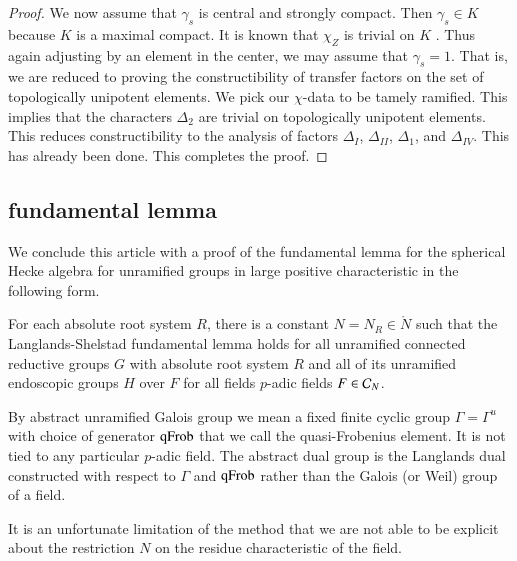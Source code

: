\begin{proof}
We now assume that $\gamma_s$ is central and strongly compact.  Then $\gamma_s\in K$ because $K$ is a maximal compact.
It is known that $\chi_Z$ is trivial on $K$ \cite[Lemma 3.2]{hales1995fundamental}. Thus again adjusting by an element in the center,
we may assume that $\gamma_s=1$.  That is, we are reduced to proving the constructibility of transfer factors on the set of topologically
unipotent elements.  We pick our $\chi$-data to be tamely ramified.  This implies that the characters $\Delta_2$ are trivial
on topologically unipotent elements.  This reduces constructibility to the analysis of factors $\Delta_I$, $\Delta_{II}$, $\Delta_1$, and $\Delta_{IV}$.
This has already been done.  This completes the proof.
\end{proof}


\subsection{fundamental lemma}

We conclude this article with a proof of the fundamental lemma for the spherical Hecke algebra for unramified groups in large positive characteristic
in the following form.

\begin{theorem}  \label{thm:fl}
For each absolute root system $R$,
there is a constant $N=N_R\in\ring{N}$ such that
the Langlands-Shelstad fundamental lemma holds for all unramified connected reductive groups $G$ with absolute root system $R$ 
and all of its unramified endoscopic groups $H$ over $F$ 
for all fields $p$-adic fields $F\in \mathcal C_N$.
\end{theorem}

By abstract unramified Galois group we mean a fixed finite cyclic group $\Gamma=\Gamma^u$ with choice of generator ${\operatorname{qFrob}}$
that we call the quasi-Frobenius element.  It is not tied to any particular $p$-adic field.   The abstract dual group is the Langlands
dual constructed with respect to $\Gamma$ and ${\operatorname{qFrob}}$ rather than the Galois (or Weil) group of a field.

It is an unfortunate limitation of the method that we are not able to be explicit about the restriction $N$ on the residue characteristic of the field.

